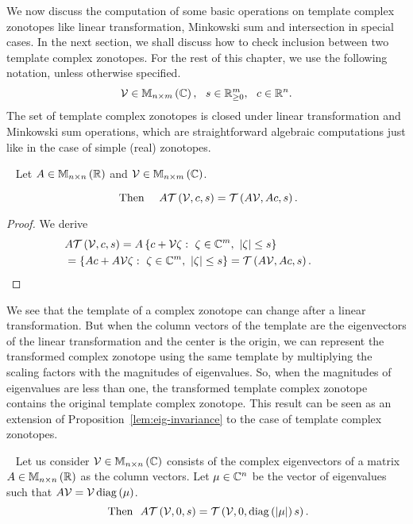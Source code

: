 We now discuss the computation of some basic operations on template
complex zonotopes like linear transformation, Minkowski sum and
intersection in special cases.  In the next section, we shall discuss
how to check inclusion between two template complex zonotopes.  For
the rest of this chapter, we use the following notation, unless
otherwise specified.
%
\begin{align*}
\mathcal{V}\in\mathbb{M}_{n\times m}\left(\mathbb{C}\right),~~s\in\mathbb{R}^m_{\geq 0},~~c\in\mathbb{R}^n.
\end{align*}
%
The set of template complex zonotopes is closed under linear transformation and
{Minkowski sum} operations, which are straightforward algebraic
computations just like in the case of simple (real) zonotopes.
%
\begin{lemma}~\label{lem:lin-transform}
Let $A\in\mathbb{M}_{n\times n}\left(\mathbb{R}\right)$ and $\mathcal{V}\in\mathbb{M}_{n\times m}\left(\mathbb{C}\right)$.

%
\begin{equation*}~\label{eqn:lin-transform}
\text{Then}~~~~A\mathit{\operatorname{\mathcal{T}}}\left(\mathcal{V},c,s\right)=\mathit{\operatorname{\mathcal{T}}}\left(A\mathcal{V},Ac,s\right).
\end{equation*}
%
\end{lemma}
%
\begin{proof}
  We derive
  \begin{align*}
&
    A\mathit{\operatorname{\mathcal{T}}}\left(\mathcal{V},c,s\right)=A\left\{c+\mathcal{V}\zeta:~\zeta\in\mathbb{C}^m,~\left|\zeta\right|\leq
    s\right\}\\
    & =\left\{Ac+A\mathcal{V}\zeta:~\zeta\in\mathbb{C}^m,~\left|\zeta\right|\leq
    s\right\}=\mathit{\operatorname{\mathcal{T}}}\left(A\mathcal{V},Ac,s\right).~\hspace{3em}\qedhere
  \end{align*}
\end{proof}
%
We see that the template of a complex zonotope can change after a
linear transformation.  But when the column vectors of the template
are the eigenvectors of the linear transformation and the center is
the origin, we can represent the transformed complex zonotope using
the same template by multiplying the scaling factors with the
magnitudes of eigenvalues.  So, when the magnitudes of eigenvalues are
less than one, the transformed template complex zonotope contains the
original template complex zonotope.  This result can be seen as an
extension of Proposition~\ref{lem:eig-invariance} to the case of
template complex zonotopes.
%
\begin{lemma}~\label{lem:eig-scaling}
Let us consider $\mathcal{V}\in\mathbb{M}_{n\times n}\left(\mathbb{C}\right)$ consists of the complex
eigenvectors of a matrix $A\in\mathbb{M}_{n\times n}\left(\mathbb{R}\right)$ as the column vectors.
Let $\mu\in\mathbb{C}^n$ be the vector of eigenvalues such that
$A\mathcal{V}=\mathcal{V}\operatorname{diag}\left(\mu\right)$.
%
\begin{equation}~\label{eqn:eigen-scaling}
\text{Then}~~A\mathit{\operatorname{\mathcal{T}}}\left(\mathcal{V},0,s\right)=\mathit{\operatorname{\mathcal{T}}}\left(\mathcal{V},0,\operatorname{diag}\left(\left|\mu\right|\right)s\right).
\end{equation}
%
\end{lemma}

